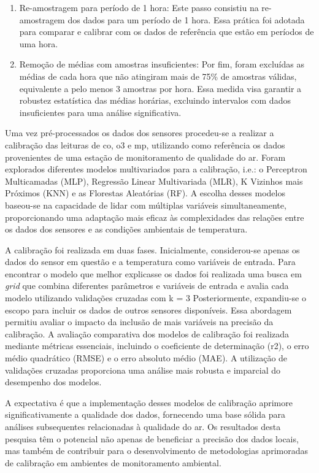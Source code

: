 \begin{enumerate}
    \item Re-amostragem para período de 1 hora: Este passo consistiu na re-amostragem dos dados para um período de 1 hora. Essa prática foi adotada para comparar e calibrar com os dados de referência que estão em períodos de uma hora.
    \item Remoção de médias com amostras insuficientes: Por fim, foram excluídas as médias de cada hora que não atingiram mais de 75\% de amostras válidas, equivalente a pelo menos 3 amostras por hora. Essa medida visa garantir a robustez estatística das médias horárias, excluindo intervalos com dados insuficientes para uma análise significativa.
\end{enumerate}

Uma vez pré-processados os dados dos sensores procedeu-se a realizar a calibração das leituras de \acrshort{co}, \acrshort{o3} e \acrshort{mp}, utilizando como referência os dados provenientes de uma estação de monitoramento de qualidade do ar. Foram explorados diferentes modelos multivariados para a calibração, i.e.: o Perceptron Multicamadas (MLP), Regressão Linear Multivariada (MLR), K Vizinhos mais Próximos (KNN) e as Florestas Aleatórias (RF). A escolha desses modelos baseou-se na capacidade de lidar com múltiplas variáveis simultaneamente, proporcionando uma adaptação mais eficaz às complexidades das relações entre os dados dos sensores e as condições ambientais de temperatura.

A calibração foi realizada em duas fases. Inicialmente, considerou-se apenas os dados do sensor em questão e a temperatura como variáveis de entrada. Para encontrar o modelo que melhor explicasse os dados foi realizada uma busca em \textit{grid} que combina diferentes parâmetros e variáveis de entrada e avalia cada modelo utilizando validações cruzadas com k = 3 Posteriormente, expandiu-se o escopo para incluir os dados de outros sensores disponíveis. Essa abordagem permitiu avaliar o impacto da inclusão de mais variáveis na precisão da calibração. A avaliação comparativa dos modelos de calibração foi realizada mediante métricas essenciais, incluindo o coeficiente de determinação (r2), o erro médio quadrático (RMSE) e o erro absoluto médio (MAE). A utilização de validações cruzadas proporciona uma análise mais robusta e imparcial do desempenho dos modelos.

A expectativa é que a implementação desses modelos de calibração aprimore significativamente a qualidade dos dados, fornecendo uma base sólida para análises subsequentes relacionadas à qualidade do ar. Os resultados desta pesquisa têm o potencial não apenas de beneficiar a precisão dos dados locais, mas também de contribuir para o desenvolvimento de metodologias aprimoradas de calibração em ambientes de monitoramento ambiental.